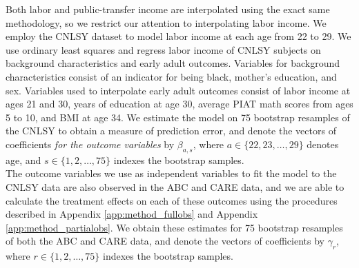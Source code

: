 \noindent Both labor and public-transfer income are interpolated using the exact same methodology, so we restrict
our attention to interpolating labor income. We employ the CNLSY dataset to model labor
income at each age from 22 to 29. We use ordinary least squares and regress labor income of
CNLSY subjects on background characteristics and early adult outcomes. Variables for background
characteristics consist of an indicator for being  black, mother's education, and sex. Variables
used to interpolate early adult outcomes consist of labor income at ages 21 and 30, years of education at age 30, average
PIAT math scores from ages 5 to 10, and BMI at age 34. We estimate the model on 75 bootstrap
resamples of the CNLSY to obtain a measure of prediction error, and denote the vectors of coefficients
\emph{for the outcome variables} by $\beta_{a,s}$, where $a \in \{22, 23, \dots, 29\}$ denotes age, and
$s \in \{1,2,\dots, 75\}$ indexes the bootstrap samples. \\




\noindent The outcome variables we use as independent variables to fit the model to the CNLSY data are also
observed in the ABC and CARE data, and we are able to calculate the treatment effects on each of these outcomes
using the procedures described in Appendix \ref{app:method_fullobs} and Appendix \ref{app:method_partialobs}. We
obtain these estimates for 75 bootstrap resamples of both the ABC and CARE data, and denote the vectors of
coefficients by $\gamma_r$, where $r \in \{1,2,\dots,75\}$ indexes the bootstrap samples. \\

